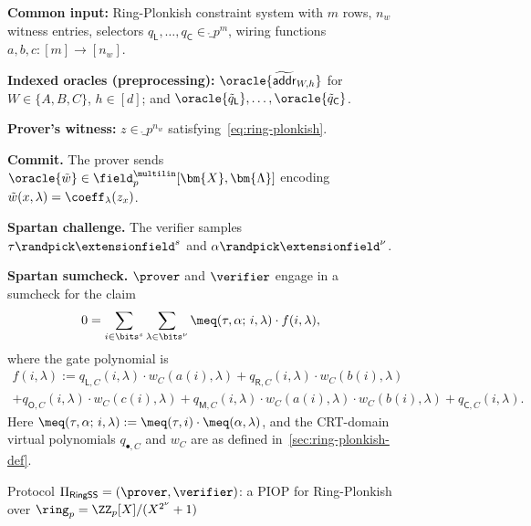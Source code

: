 \begin{figure}[H]
\caption{Protocol $\Pi_{\mathsf{RingSS}} = (\prover, \verifier)$: a PIOP for Ring-Plonkish over $\ring_p = \ZZ_p[X]/(X^{2^\nu}+1)$}
\label{prot:ring-speedyspartan}
\begin{algorithm}[H]
\textbf{Common input:} Ring-Plonkish constraint system with $m$ rows, $n_w$ witness entries, selectors $q_\mathsf{L}, \ldots, q_\mathsf{C} \in \ring_p^m$, wiring functions $a, b, c : [m] \to [n_w]$.

\medskip\noindent
\textbf{Indexed oracles (preprocessing):} $\oracle{\widetilde{\mathsf{addr}}_{W,h}}$ for $W \in \{A,B,C\}$, $h \in [d]$; and $\oracle{\tilde{q}_\mathsf{L}}, \ldots, \oracle{\tilde{q}_\mathsf{C}}$.

\medskip\noindent
\textbf{Prover's witness:} $z \in \ring_p^{n_w}$ satisfying~\eqref{eq:ring-plonkish}.

\begin{algorithmic}[1]
    \STATE \textbf{Commit.} The prover sends $\oracle{\tilde{w}} \in \field_p^{\multilin}[\bm{X}, \bm{\Lambda}]$ encoding $\tilde{w}(x, \lambda) = \coeff_\lambda(z_x)$.

    \STATE \textbf{Spartan challenge.} The verifier samples $\tau \randpick \extensionfield^s$ and $\alpha \randpick \extensionfield^\nu$.

    \STATE \textbf{Spartan sumcheck.} $\prover$ and $\verifier$ engage in a sumcheck for the claim
    \begin{equation}\label{eq:spartan-sumcheck}
        0 = \sum_{i \in \bits^s} \sum_{\lambda \in \bits^\nu} \meq(\tau, \alpha;\, i, \lambda) \cdot f(i, \lambda),
    \end{equation}
    where the gate polynomial is
    \begin{multline}\label{eq:gate-poly}
        f(i, \lambda) := q_{\mathsf{L},C}(i,\lambda) \cdot w_C(a(i), \lambda) + q_{\mathsf{R},C}(i,\lambda) \cdot w_C(b(i), \lambda) \\
        + q_{\mathsf{O},C}(i,\lambda) \cdot w_C(c(i), \lambda)
        + q_{\mathsf{M},C}(i,\lambda) \cdot w_C(a(i), \lambda) \cdot w_C(b(i), \lambda)
        + q_{\mathsf{C},C}(i,\lambda).
    \end{multline}
    Here $\meq(\tau, \alpha;\, i, \lambda) := \meq(\tau, i) \cdot \meq(\alpha, \lambda)$, and the CRT-domain virtual polynomials $q_{\bullet,C}$ and $w_C$ are as defined in~\cref{sec:ring-plonkish-def}.


\end{algorithmic}
\end{algorithm}
\end{figure}

